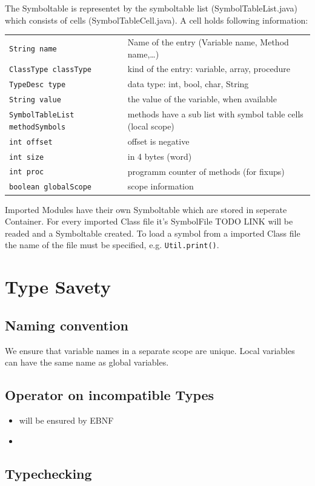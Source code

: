 The Symboltable is representet by the symboltable list (SymbolTableList.java) which consists of cells (SymbolTableCell.java).
A cell holds following information:
\newline
\newline
\begin{tabular}{lp{6cm}}
\texttt{String name} & Name of the entry (Variable name, Method name,\ldots) \\
\texttt{ClassType classType} & kind of the entry: variable, array, procedure \\
\texttt{TypeDesc type} & data type: int, bool, char, String \\
\texttt{String value} & the value of the variable, when available \\
\texttt{SymbolTableList methodSymbols} & methods have a sub list with symbol table cells (local scope)\\
\texttt{int offset} & offset is negative \\
\texttt{int size} & in 4 bytes (word) \\
\texttt{int proc} & programm counter of methods (for fixups) \\
\texttt{boolean globalScope} & scope information \\
\end{tabular}

Imported Modules have their own Symboltable which are stored in seperate Container. For every imported Class file it's SymbolFile TODO LINK will be readed and a Symboltable created. To load a symbol from a imported Class file the name of the file must be specified, e.g. \texttt{Util.print()}.

\section {Type Savety}
\label{labelTypeCheck}

\subsection{Naming convention}
We ensure that variable names in a separate scope are unique. Local variables can have the same name as global variables. 

\subsection{Operator on incompatible Types}
\begin{itemize}
  \item will be ensured by EBNF
  \item 
\end{itemize}

\subsection{Typechecking}




